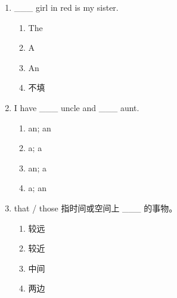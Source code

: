 \documentclass[11pt,a4paper]{ctexart}
\begin{document}
\begin{enumerate}[leftmargin=*,itemsep=4pt]
\item \_\_\_ girl in red is my sister.
\begin{enumerate}[label=\Alph*.,leftmargin=2em,itemsep=1pt,topsep=2pt]
\item The
\item A
\item An
\item 不填
\end{enumerate}
\item I have \_\_\_ uncle and \_\_\_ aunt.
\begin{enumerate}[label=\Alph*.,leftmargin=2em,itemsep=1pt,topsep=2pt]
\item an; an
\item a; a
\item an; a
\item a; an
\end{enumerate}
\item that / those 指时间或空间上 \_\_\_ 的事物。
\begin{enumerate}[label=\Alph*.,leftmargin=2em,itemsep=1pt,topsep=2pt]
\item 较远
\item 较近
\item 中间
\item 两边
\end{enumerate}
\end{enumerate}

\newpage
\end{document}
